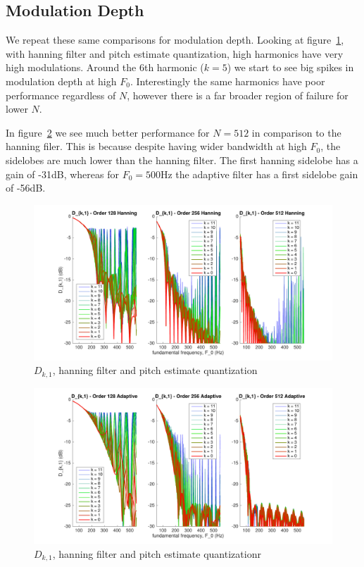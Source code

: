 \documentclass [11pt, proquest] {uwthesis}[2015/03/03]
\begin{document}
\subsection{Modulation Depth}

We repeat these same comparisons for modulation depth.  Looking at figure~\ref{fig:pitch_d_ki_1}, with hanning filter and pitch estimate quantization, high harmonics have very high modulations.  Around the 6th harmonic ($k = 5$) we start to see big spikes in modulation depth at high $F_0$.  Interestingly the same harmonics have poor performance regardless of $N$, however there is a far broader region of failure for lower $N$.

In  figure~\ref{fig:pitch_d_ki_2} we see much better performance for $N = 512$ in comparison to the hanning filer.  This is because despite having wider bandwidth at high $F_0$, the sidelobes are much lower than the hanning filter.  The first hanning sidelobe has a gain of -31dB, whereas for $F_0 = 500$Hz the adaptive filter has a first sidelobe gain of -56dB.

\begin{figure}[!ht]
  \centering
    \includegraphics[width=1\textwidth]{pitch_d_ki_1}
    \caption{$D_{k,1}$, hanning filter and pitch estimate quantization}\label{fig:pitch_d_ki_1}
\end{figure}

\begin{figure}[!ht]
  \centering
    \includegraphics[width=1\textwidth]{pitch_d_ki_2}
    \caption{$D_{k,1}$, hanning filter and pitch estimate quantizationr}\label{fig:pitch_d_ki_2}
\end{figure}
\end{document}
